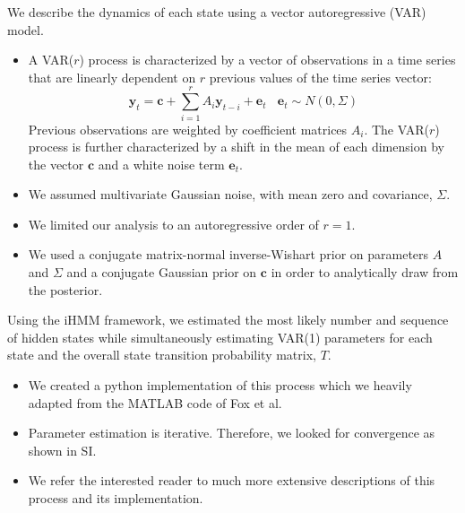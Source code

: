 \documentclass{article}
\begin{document}
  \noindent We describe the dynamics of each state using a vector autoregressive (VAR) model. 
  \begin{itemize}
  	\item A VAR($r$) process is characterized by a vector of observations in a time series 
  	that are linearly dependent on $r$ previous values of the time series vector:
  	\begin{equation}
  	\mathbf{y}_t = \mathbf{c} + \sum_{i=1}^r A_i\mathbf{y}_{t-i} + \mathbf{e}_t~~~~\mathbf{e}_t \sim N(0, \Sigma)
  	\end{equation}
  	Previous observations are weighted by coefficient matrices $A_i$. The VAR($r$) 
  	process is further characterized by a shift in the mean of each dimension by the
  	vector $\mathbf{c}$ and a white noise term $\mathbf{e}_t$.~\cite{hamilton_time_1994}
  	\item We assumed multivariate Gaussian noise, with mean zero and covariance, $\Sigma$.
  	\item We limited our analysis to an autoregressive order of $r=1$. %
  	\item We used a conjugate matrix-normal inverse-Wishart prior on parameters
  	$A$ and $\Sigma$ and a conjugate Gaussian prior on $\mathbf{c}$ in order to analytically
  	draw from the posterior.~\cite{fox_nonparametric_2009}
  \end{itemize}   
  
  Using the iHMM framework, we estimated the most likely number and sequence of hidden states
  while simultaneously estimating VAR(1) parameters for each state and the overall 
  state transition probability matrix, $T$.
  \begin{itemize}
    \item We created a python implementation of this process which we heavily adapted from
    the MATLAB code of Fox et al.~\cite{fox_sticky_2007} 
    \item Parameter estimation is iterative. Therefore, we looked for convergence 
    as shown in SI.
    \item We refer the interested reader to much more extensive descriptions of 
    this process and its implementation. 
    ~\cite{beal_infinite_2002,teh_hierarchical_2006,van_gael_beam_2008,fox_nonparametric_2009,fox_bayesian_2010}
  \end{itemize}
  
\end{document}
